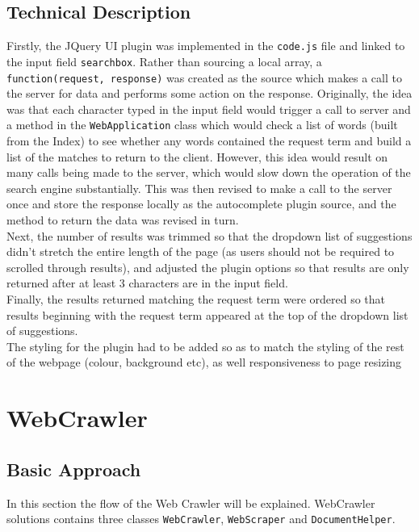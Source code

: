 \subsection{Technical Description}
Firstly, the JQuery UI plugin was implemented in the {\tt code.js} file and linked to the input field {\tt searchbox}.
Rather than sourcing a local array, a {\tt function(request, response)} was created as the source which makes a call to the server for data and performs some action on the response.
Originally, the idea was that each character typed in the input field would trigger a call to server and a method in the {\tt WebApplication} class which would check a list of words (built from the Index) to see whether any words contained the request term and build a list of the matches to return to the client.
However, this idea would result on many calls being made to the server, which would slow down the operation of the search engine substantially. This was then revised to make a call to the server once and store the response locally as the autocomplete plugin source, and the method to return the data was revised in turn.
\\
Next, the number of results was trimmed so that the dropdown list of suggestions didn't stretch the entire length of the page (as users should not be required to scrolled through results), and adjusted the plugin options so that results are only returned after at least 3 characters are in the input field.
\\
Finally, the results returned matching the request term were ordered so that results beginning with the request term appeared at the top of the dropdown list of suggestions.
\\
The styling for the plugin had to be added so as to match the styling of the rest of the webpage (colour, background etc), as well responsiveness to page resizing

\section{WebCrawler}
\subsection{Basic Approach}

In this section the flow of the Web Crawler will be explained.  
WebCrawler solutions contains three classes {\tt WebCrawler}, {\tt WebScraper} and {\tt DocumentHelper}.


